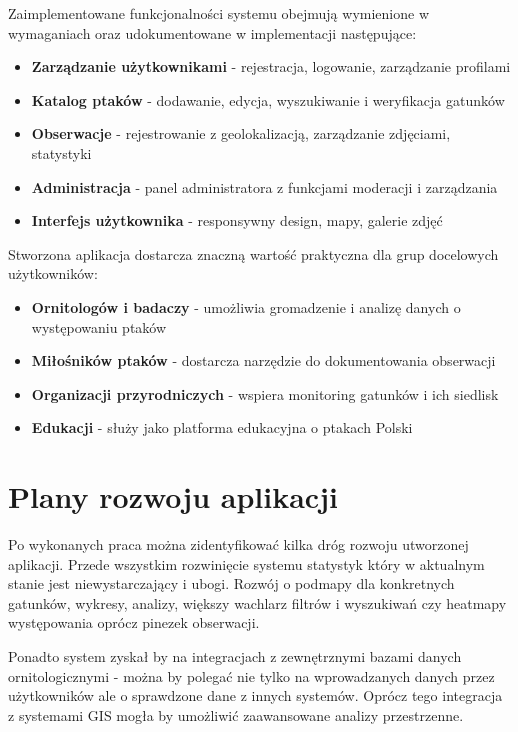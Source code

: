Zaimplementowane funkcjonalności systemu obejmują wymienione w wymaganiach oraz udokumentowane w implementacji następujące:
\begin{itemize}
	\item \textbf{Zarządzanie użytkownikami} - rejestracja, logowanie, zarządzanie profilami
	\item \textbf{Katalog ptaków} - dodawanie, edycja, wyszukiwanie i weryfikacja gatunków
	\item \textbf{Obserwacje} - rejestrowanie z geolokalizacją, zarządzanie zdjęciami, statystyki
	\item \textbf{Administracja} - panel administratora z funkcjami moderacji i zarządzania
	\item \textbf{Interfejs użytkownika} - responsywny design, mapy, galerie zdjęć
\end{itemize}

Stworzona aplikacja dostarcza znaczną wartość praktyczna dla grup docelowych użytkowników:
\begin{itemize}
	\item \textbf{Ornitologów i badaczy} - umożliwia gromadzenie i analizę danych o występowaniu ptaków
	\item \textbf{Miłośników ptaków} - dostarcza narzędzie do dokumentowania obserwacji
	\item \textbf{Organizacji przyrodniczych} - wspiera monitoring gatunków i ich siedlisk
	\item \textbf{Edukacji} - służy jako platforma edukacyjna o ptakach Polski
\end{itemize}

\section*{Plany rozwoju aplikacji}

Po wykonanych praca można zidentyfikować kilka dróg rozwoju utworzonej aplikacji. Przede wszystkim rozwinięcie systemu statystyk który w aktualnym stanie jest niewystarczający i ubogi. Rozwój o podmapy dla konkretnych gatunków, wykresy, analizy, większy wachlarz filtrów i wyszukiwań czy heatmapy występowania oprócz pinezek obserwacji.

Ponadto system zyskał by na integracjach z zewnętrznymi bazami danych ornitologicznymi - można by polegać nie tylko na wprowadzanych danych przez użytkowników ale o sprawdzone dane z innych systemów. Oprócz tego integracja z systemami GIS mogła by umożliwić zaawansowane analizy przestrzenne.

